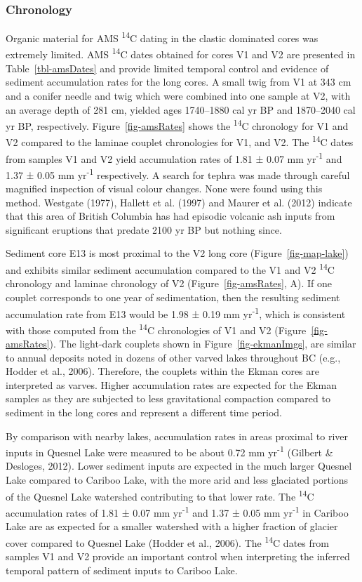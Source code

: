 \documentclass[
  letterpaper,
  DIV=11,
  numbers=noendperiod]{scrartcl}
\begin{document}
\hypertarget{chronology}{%
\subsubsection{Chronology}\label{chronology}}

Organic material for AMS \textsuperscript{14}C dating in the clastic
dominated cores was extremely limited. AMS \textsuperscript{14}C dates
obtained for cores V1 and V2 are presented in Table~\ref{tbl-amsDates}
and provide limited temporal control and evidence of sediment
accumulation rates for the long cores. A small twig from V1 at 343 cm
and a conifer needle and twig which were combined into one sample at V2,
with an average depth of 281 cm, yielded ages 1740--1880 cal yr BP and
1870--2040 cal yr BP, respectively. Figure~\ref{fig-amsRates} shows the
\textsuperscript{14}C chronology for V1 and V2 compared to the laminae
couplet chronologies for V1, and V2. The \textsuperscript{14}C dates
from samples V1 and V2 yield accumulation rates of 1.81 ± 0.07 mm
yr\textsuperscript{-1} and 1.37 ± 0.05 mm yr\textsuperscript{-1}
respectively. A search for tephra was made through careful magnified
inspection of visual colour changes. None were found using this method.
Westgate (1977), Hallett et al. (1997) and Maurer et al. (2012) indicate
that this area of British Columbia has had episodic volcanic ash inputs
from significant eruptions that predate 2100 yr BP but nothing since.

Sediment core E13 is most proximal to the V2 long core
(Figure~\ref{fig-map-lake}) and exhibits similar sediment accumulation
compared to the V1 and V2 \textsuperscript{14}C chronology and laminae
chronology of V2 (Figure~\ref{fig-amsRates}, A). If one couplet
corresponds to one year of sedimentation, then the resulting sediment
accumulation rate from E13 would be 1.98 ± 0.19 mm
yr\textsuperscript{-1}, which is consistent with those computed from the
\textsuperscript{14}C chronologies of V1 and V2
(Figure~\ref{fig-amsRates}). The light-dark couplets shown in
Figure~\ref{fig-ekmanImgs}, are similar to annual deposits noted in
dozens of other varved lakes throughout BC (e.g., Hodder et al., 2006).
Therefore, the couplets within the Ekman cores are interpreted as
varves. Higher accumulation rates are expected for the Ekman samples as
they are subjected to less gravitational compaction compared to sediment
in the long cores and represent a different time period.

By comparison with nearby lakes, accumulation rates in areas proximal to
river inputs in Quesnel Lake were measured to be about 0.72 mm
yr\textsuperscript{-1} (Gilbert \& Desloges, 2012). Lower sediment
inputs are expected in the much larger Quesnel Lake compared to Cariboo
Lake, with the more arid and less glaciated portions of the Quesnel Lake
watershed contributing to that lower rate. The \textsuperscript{14}C
accumulation rates of 1.81 ± 0.07 mm yr\textsuperscript{-1} and 1.37 ±
0.05 mm yr\textsuperscript{-1} in Cariboo Lake are as expected for a
smaller watershed with a higher fraction of glacier cover compared to
Quesnel Lake (Hodder et al., 2006). The \textsuperscript{14}C dates from
samples V1 and V2 provide an important control when interpreting the
inferred temporal pattern of sediment inputs to Cariboo Lake.
\end{document}

